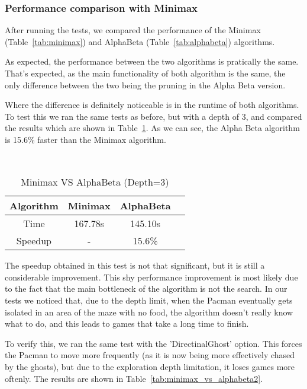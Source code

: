 \documentclass{article}
\begin{document}
\subsubsection{Performance comparison with Minimax}
After running the tests, we compared the performance of the Minimax (Table~\ref{tab:minimax}) and AlphaBeta (Table~\ref{tab:alphabeta}) algorithms.

As expected, the performance between the two algorithms is pratically the same. That's expected, as the main functionality of both algorithm is the same, the only difference between the two being the pruning in the Alpha Beta version.

Where the difference is definitely noticeable is in the runtime of both algorithms. To test this we ran the same tests as before, but with a depth of 3, and compared the results which are shown in Table~\ref{tab:minimax_vs_alphabeta}. As we can see, the Alpha Beta algorithm is 15.6\% faster than the Minimax algorithm.

~\\
\begin{table}[!ht]
  \begin{center}
    \begin{tabular}{||c||c|c|c||}
      \hline
      Algorithm & Minimax & AlphaBeta \\
      \hline\hline
      Time & 167.78s & 145.10s \\
      \hline\hline
      Speedup & - & 15.6\% \\
      \hline
    \end{tabular}
    \caption{Minimax VS AlphaBeta (Depth=3)}
    \label{tab:minimax_vs_alphabeta}
  \end{center}
\end{table}

The speedup obtained in this test is not that significant, but it is still a considerable improvement. This shy performance improvement is most likely due to the fact that the main bottleneck of the algorithm is not the search. In our tests we noticed that, due to the depth limit, when the Pacman eventually gets isolated in an area of the maze with no food, the algorithm doesn't really know what to do, and this leads to games that take a long time to finish.

To verify this, we ran the same test with the 'DirectinalGhost' option. This forces the Pacman to move more frequently (as it is now being more effectively chased by the ghosts), but due to the exploration depth limitation, it loses games more oftenly. The results are shown in Table~\ref{tab:minimax_vs_alphabeta2}.
\end{document}

